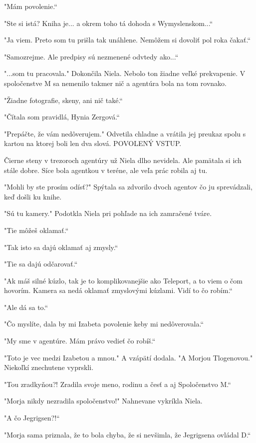 \documentclass{book}
\begin{document}
"$ $Mám povolenie.“

"$ $Ste si istá? Kniha je... a okrem toho tá dohoda s Wymyslenskom...“

"$ $Ja viem. Preto som tu prišla tak unáhlene. Nemôžem si dovoliť pol roka čakať.“

"$ $Samozrejme. Ale predpisy sú nezmenené odvtedy ako...“

"$ $...som tu pracovala."$ $ Dokončila Niela. Nebolo ton žiadne veľké prekvapenie. V spoločenstve M sa nemenilo takmer nič a agentúra bola na tom rovnako.

"$ $Žiadne fotografie, skeny, ani nič také.“

"$ $Čítala som pravidlá, Hynia Zergová.“

"$ $Prepáčte, že vám nedôverujem."$ $ Odvetila chladne a vrátila jej preukaz spolu s kartou na ktorej boli len dva slová. POVOLENÝ VSTUP.

Čierne steny v trezoroch agentúry už Niela dlho nevidela. Ale pamätala si ich stále dobre. Síce bola agentkou v teréne, ale veľa prác robila aj tu.

"$ $Mohli by ste prosím odísť?"$ $ Spýtala sa zdvorilo dvoch agentov čo ju sprevádzali, keď došli ku knihe.

"$ $Sú tu kamery."$ $ Podotkla Niela pri pohľade na ich zamračené tváre.

"$ $Tie môžeš oklamať.“

"$ $Tak isto sa dajú oklamať aj zmysly.“

"$ $Tie sa dajú odčarovať.“

"$ $Ak máš silné kúzlo, tak je to komplikovanejšie ako Teleport, a to viem o čom hovorím. Kamera sa nedá oklamať zmyslovými kúzlami. Vidí to čo robím.“

"$ $Ale dá sa to.“

"$ $Čo myslíte, dala by mi Izabeta povolenie keby mi nedôverovala.“

"$ $My sme v agentúre. Mám právo vedieť čo robíš.“

"$ $Toto je vec medzi Izabetou a mnou."$ $ A vzápätí dodala. "$ $A Morjou Tlogenovou."$ $ Niekoľkí znechutene vyprskli.

"$ $Tou zradkyňou?! Zradila svoje meno, rodinu a česť a aj Spoločenstvo M.“

"$ $Morja nikdy nezradila spoločenstvo!"$ $ Nahnevane vykríkla Niela.

"$ $A čo Jegrigsen?!“

"$ $Morja sama priznala, že to bola chyba, že si nevšimla, že Jegrigsena ovládal D.“
\end{document}
